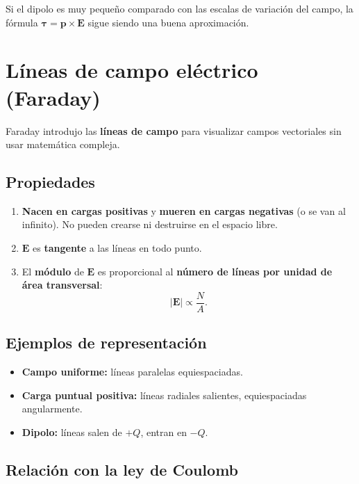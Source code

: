 \documentclass[12pt,a4paper]{article}
\begin{document}
\begin{notebox}
  Si el dipolo es muy pequeño comparado con las escalas de variación
  del campo, la fórmula $\boldsymbol{\tau} = \mathbf{p} \times
  \mathbf{E}$ sigue siendo una buena aproximación.
\end{notebox}

\section{Líneas de campo eléctrico (Faraday)}

Faraday introdujo las \textbf{líneas de campo} para visualizar campos
vectoriales sin usar matemática compleja.

\subsection{Propiedades}

\begin{enumerate}[nosep]
  \item \textbf{Nacen en cargas positivas} y \textbf{mueren en cargas
        negativas} (o se van al infinito). No pueden crearse ni
        destruirse en el espacio libre.
  \item $\mathbf{E}$ es \textbf{tangente} a las líneas en todo punto.
  \item El \textbf{módulo} de $\mathbf{E}$ es proporcional al
        \textbf{número de líneas por unidad de área transversal}:
        \[
        |\mathbf{E}| \propto \frac{N}{A}.
        \]
\end{enumerate}

\subsection{Ejemplos de representación}

\begin{itemize}[nosep]
  \item \textbf{Campo uniforme:} líneas paralelas equiespaciadas.
  \item \textbf{Carga puntual positiva:} líneas radiales salientes,
        equiespaciadas angularmente.
  \item \textbf{Dipolo:} líneas salen de $+Q$, entran en $-Q$.
\end{itemize}

\subsection{Relación con la ley de Coulomb}
\end{document}
